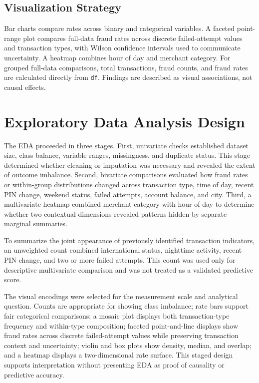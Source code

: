 \documentclass[conference,final,]{IEEEtran}
\begin{document}
\subsection{Visualization Strategy}\label{visualization-strategy}

Bar charts compare rates across binary and categorical variables. A
faceted point-range plot compares full-data fraud rates across discrete
failed-attempt values and transaction types, with Wilson confidence
intervals used to communicate uncertainty. A heatmap combines hour of
day and merchant category. For grouped full-data comparisons, total
transactions, fraud counts, and fraud rates are calculated directly from
\texttt{df}. Findings are described as visual associations, not causal
effects.

\section{Exploratory Data Analysis
Design}\label{exploratory-data-analysis-design}

The EDA proceeded in three stages. First, univariate checks established
dataset size, class balance, variable ranges, missingness, and duplicate
status. This stage determined whether cleaning or imputation was
necessary and revealed the extent of outcome imbalance. Second,
bivariate comparisons evaluated how fraud rates or within-group
distributions changed across transaction type, time of day, recent PIN
change, weekend status, failed attempts, account balance, and city.
Third, a multivariate heatmap combined merchant category with hour of
day to determine whether two contextual dimensions revealed patterns
hidden by separate marginal summaries.

To summarize the joint appearance of previously identified transaction
indicators, an unweighted count combined international status, nighttime
activity, recent PIN change, and two or more failed attempts. This count
was used only for descriptive multivariate comparison and was not
treated as a validated predictive score.

The visual encodings were selected for the measurement scale and
analytical question. Counts are appropriate for showing class imbalance;
rate bars support fair categorical comparisons; a mosaic plot displays
both transaction-type frequency and within-type composition; faceted
point-and-line displays show fraud rates across discrete failed-attempt
values while preserving transaction context and uncertainty; violin and
box plots show density, median, and overlap; and a heatmap displays a
two-dimensional rate surface. This staged design supports interpretation
without presenting EDA as proof of causality or predictive accuracy.
\end{document}
